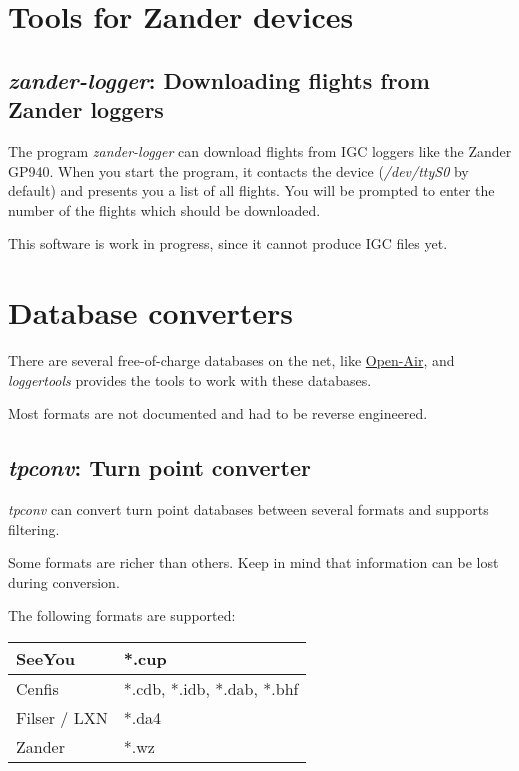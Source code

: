 \documentclass{article}
\begin{document}
\section{Tools for Zander devices}

\subsection{{\em zander-logger}: Downloading flights from Zander loggers}

The program {\em zander-logger} can download flights from IGC loggers
like the Zander GP940.  When you start the program, it contacts the
device ({\em /dev/ttyS0} by default) and presents you a list of all
flights.  You will be prompted to enter the number of the flights
which should be downloaded.

This software is work in progress, since it cannot produce IGC files
yet.


\section{Database converters}

There are several free-of-charge databases on the net, like
\href{http://www.segelflug.de/segelflieger/michael.meier/}{Open-Air},
and {\em loggertools} provides the tools to work with these databases.

Most formats are not documented and had to be reverse engineered.


\subsection{{\em tpconv}: Turn point converter}

{\em tpconv} can convert turn point databases between several formats
and supports filtering.

Some formats are richer than others.  Keep in mind that information
can be lost during conversion.

The following formats are supported:

\begin{tabular}{|l|l|}
\hline
SeeYou & *.cup \\
\hline
Cenfis & *.cdb, *.idb, *.dab, *.bhf \\
\hline
Filser / LXN & *.da4 \\
\hline
Zander & *.wz \\
\hline
\end{tabular}
\end{document}
